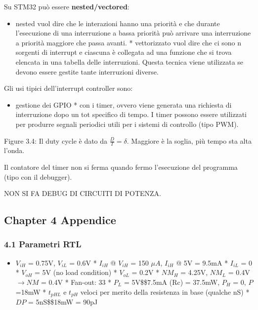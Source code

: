 \documentclass[
]{article}
\providecommand{\tightlist}{%
  \setlength{\itemsep}{0pt}\setlength{\parskip}{0pt}}
\begin{document}
Su STM32 può essere \textbf{nested/vectored}:

\begin{itemize}
\tightlist
\item
  nested vuol dire che le interazioni hanno una priorità e che durante
  l'esecuzione di una interruzione a bassa priorità può arrivare una
  interruzione a priorità maggiore che passa avanti. * vettorizzato vuol
  dire che ci sono n sorgenti di interrupt e ciascuna è collegata ad una
  funzione che si trova elencata in una tabella delle interruzioni.
  Questa tecnica viene utilizzata se devono essere gestite tante
  interruzioni diverse.
\end{itemize}

Gli usi tipici dell'interrupt controller sono:

\begin{itemize}
\tightlist
\item
  gestione dei GPIO * con i timer, ovvero viene generata una richiesta
  di interruzione dopo un tot specifico di tempo. I timer possono essere
  utilizzati per produrre segnali periodici utili per i sistemi di
  controllo (tipo PWM).
\end{itemize}

Figure 3.4: Il duty cycle è dato da \(\frac{D}{T}=\delta\). Maggiore è
la soglia, più tempo sta alta l'onda.

Il contatore del timer non si ferma quando fermo l'esecuzione del
programma (tipo con il debugger).

NON SI FA DEBUG DI CIRCUITI DI POTENZA.

\subsection{Chapter 4 Appendice}\label{chapter-4-appendice}

\subsubsection{4.1 Parametri RTL}\label{parametri-rtl}

\begin{itemize}
\tightlist
\item
  \(V_{iH}\) = 0.75V, \(V_{iL}\) = 0.6V * \(I_{iH}\) @ \(V_{iH}\) = 150
  \(\mu A\), \(I_{iH}\) @ 5V = 9.5mA * \(I_{iL}\) = 0 * \(V_{oH}\) = 5V
  (no load condition) * \(V_{oL}\) = 0.2V * \(NM_{H}\) = 4.25V,
  \(NM_{L}\) = 0.4V \(\to NM\) = 0.4V * Fan-out: 33 * \(P_{L}\) =
  5V\$\times\$7.5mA (Rc) = 37.5mW, \(P_{H}\) = 0, \(P\) =18mW *
  \(t_{pHL}\) e \(t_{pH}\) veloci per merito della resistenza in base
  (qualche nS) * \(DP\) = 5nS\$\times\$18mW = 90pJ
\end{itemize}
\end{document}
